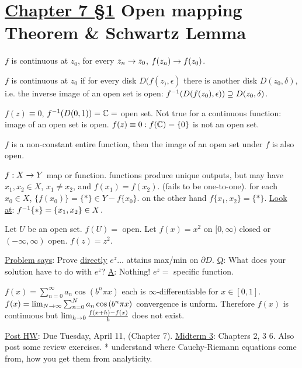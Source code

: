 \documentclass[]{article}
\begin{document}
\section{\underline{Chapter 7 \S1} Open mapping Theorem \& Schwartz Lemma}

\begin{definition}
	$f$ is continuous at $z_0$, for every $z_n\rightarrow z_0$, $f(z_n) \rightarrow f(z_0)$.
\end{definition}
\begin{theorem}
	$f$ is continuous at $z_0$ if for every disk $D(f(z_),\epsilon)$ there is another disk $D(z_0,\delta)$, i.e. the inverse image of an open set is open: $f^{-1} (D(f(z_0),\epsilon)) \supseteq D(z_0,\delta)$.
\end{theorem}
\begin{example}
	$f(z) \equiv 0$, $f^{-1}(D(0,1)) = \mathbb{C} = $ open set. Not true for a continuous function: image of an open set is open. $f(z) \equiv 0:f(\mathbb{C}) = \{0\}$ is not an open set.
\end{example}
\begin{theorem}
	 $f$ is a non-constant entire function, then the image of an open set under $f$ is also open.
\end{theorem}
$f:X\rightarrow Y$ map or function. functions produce unique outputs, but may have $x_1,x_2 \in X$, $x_1\neq x_2$, and $f(x_1) = f(x_2)$. (fails to be one-to-one). for each $x_0\in X$, $\{f(x_0)\} = \{*\}\in Y - f\{x_0\}$. on the other hand $f\{x_1,x_2\} = \{*\}$. \underline{Look at}: $f^{-1}\{*\} = \{x_1,x_2\}\in X$.
\begin{example}
	Let $U$ be an open set. $f(U) = $ open. Let $f(x) = x^2$ on $[0,\infty)$ closed or $(-\infty,\infty)$ open. $f(z) = z^2$.
\end{example}

\begin{example}
	[HW6 \#9] \underline{Problem says}: Prove \underline{directly} $e^z\dots$ attains max/min on $\partial D$. \underline{Q}: What does your solution have to do with $e^z$? \underline{A}: Nothing!
	$e^z = $ specific function.
\end{example}

\begin{definition}
	 $f(x) = \sum_{n=0}^\infty a_n \cos{(b^n\pi x)}$
	each is $\infty$-differentiable for $x\in[0,1]$. $f(x) = \lim_{N\rightarrow\infty} \sum_{n=0}^N a_n\cos{(b^n\pi x)}$ convergence is unform. Therefore $f(x)$ is continuous but  $\lim_{h\rightarrow0} \frac{f(x+h) - f(x)}{h}$ does not exist.
\end{definition}
\underline{Post HW}: Due Tuesday, April 11, (Chapter 7). \underline{Midterm 3}: Chapters 2, 3 6. Also post some review exercises. * understand where Cauchy-Riemann equations come from, how you get them from analyticity.
\end{document}

